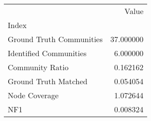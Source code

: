 \begin{tabular}{lr}
\toprule
{} &      Value \\
Index                    &            \\
\midrule
Ground Truth Communities &  37.000000 \\
Identified Communities   &   6.000000 \\
Community Ratio          &   0.162162 \\
Ground Truth Matched     &   0.054054 \\
Node Coverage            &   1.072644 \\
NF1                      &   0.008324 \\
\bottomrule
\end{tabular}
